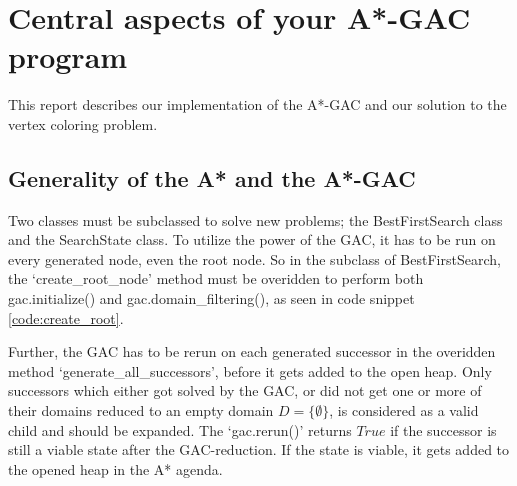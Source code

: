 
\section{Central aspects of your A*-GAC program}
This report describes our implementation of the A*-GAC and our solution to the vertex coloring problem.

\subsection{Generality of the A* and the A*-GAC}
Two classes must be subclassed to solve new problems; the BestFirstSearch class and the SearchState class. To utilize the power of the GAC, it has to be run on every generated node, even the root node. So in the subclass of BestFirstSearch, the `create\_root\_node' method must be overidden to perform both gac.initialize() and gac.domain\_filtering(), as seen in code snippet \ref{code:create_root}.



Further, the GAC has to be rerun on each generated successor in the overidden method `generate\_all\_successors', before it gets added to the open heap. Only successors which either got solved by the GAC, or did not get one or more of their domains reduced to an empty domain \( D = \{ \emptyset \}\), is considered as a valid child and should be expanded. The `gac.rerun()' returns \(True\) if the successor is still a viable state after the GAC-reduction. If the state is viable, it gets added to the opened heap in the A* agenda.

